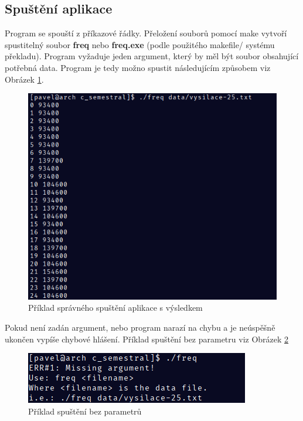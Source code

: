 \documentclass[12pt]{article}
\begin{document}
\subsection{Spuštění aplikace}
Program se spouští z příkazové řádky. Přeložení souborů pomocí make vytvoří 
spustitelný soubor \textbf{freq} nebo \textbf{freq.exe} (podle použitého
makefile/ systému překladu). Program vyžaduje jeden argument, který by měl být
soubor obsahující potřebná data. Program je tedy možno spustit následujícím 
způsobem viz Obrázek \ref{img:success}.
%
\begin{figure}[H]
        \centering
        \includegraphics{img/success.png}
        \caption{Příklad správného spuštění aplikace s výsledkem}
        \label{img:success}
\end{figure}
%
Pokud není zadán argument, nebo program narazí na chybu a je neúspěšně ukončen
vypíše chybové hlášení. Příklad spuštění bez parametru viz Obrázek 
\ref{img:fail}
\begin{figure}[H]
        \centering
        \includegraphics{img/failure.png}
        \caption{Příklad spuštění bez parametrů}
        \label{img:fail}
\end{figure}
%
\end{document}
